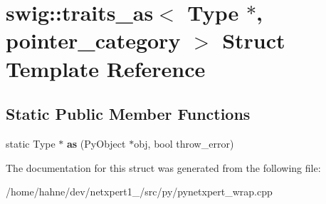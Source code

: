 \hypertarget{structswig_1_1traits__as_3_01Type_01_5_00_01pointer__category_01_4}{}\section{swig\+:\+:traits\+\_\+as$<$ Type $\ast$, pointer\+\_\+category $>$ Struct Template Reference}
\label{structswig_1_1traits__as_3_01Type_01_5_00_01pointer__category_01_4}
\subsection*{Static Public Member Functions}
\begin{DoxyCompactItemize}
\item 
static Type $\ast$ {\bfseries as} (Py\+Object $\ast$obj, bool throw\+\_\+error)\hypertarget{structswig_1_1traits__as_3_01Type_01_5_00_01pointer__category_01_4_a7312181fed828608a6a29b4ff622a85f}{}\label{structswig_1_1traits__as_3_01Type_01_5_00_01pointer__category_01_4_a7312181fed828608a6a29b4ff622a85f}

\end{DoxyCompactItemize}


The documentation for this struct was generated from the following file\+:\begin{DoxyCompactItemize}
\item 
/home/hahne/dev/netxpert1\+\_/src/py/pynetxpert\+\_\+wrap.\+cpp\end{DoxyCompactItemize}
